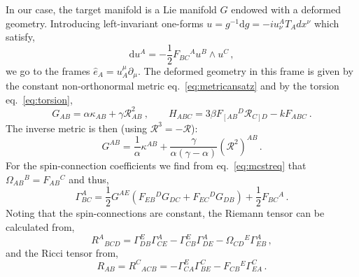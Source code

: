 \documentclass[12pt]{article}
\def\RR{{\mathfrak R}}
\def\ee{\boldsymbol{e}}
\def\RR{{\mathfrak R}}
\def\R{{\mathbb R}}
\def\be{\begin{equation}}
\def\ee{\end{equation}}
\renewcommand{\R}{\mathcal{R}}
\renewcommand{\RR}{(\mathcal{R}^{2})}
\begin{document}
In our case, the target manifold is a Lie manifold $G$ endowed with a deformed geometry. Introducing  left-invariant one-forms $u=g^{-1}\mathrm{d}g = -i u^{A}_\nu T_A  d x^\nu  $ which satisfy,
\begin{equation}\label{eq:mcstreq}
\mathrm{d}u^{A}  = -\frac{1}{2} F_{BC}{}^A u^B \wedge u^C \,,
\end{equation}
we go to the frames $\hat{e}_A = u_A^\mu \partial_\mu$.
The deformed geometry in this frame is given by the constant non-orthonormal metric eq.~\eqref{eq:metricansatz} and by the torsion eq.~\eqref{eq:torsion},
 \be
 G_{AB} =  \alpha \kappa_{AB} +\gamma   \R^{2}_{AB} \ , \qquad H_{ABC}=  3 \beta F_{\left[AB\right.}{}^{D}\R_{\left.C\right]D} -k F_{ABC}  \ .
 \ee
The inverse metric is then (using $\R^{3} = -\R$):
\begin{equation}
G^{AB} = \frac{1}{\alpha}\kappa^{AB} + \frac{\gamma}{\alpha(\gamma - \alpha)}\RR^{AB}\,.
\end{equation}
For the spin-connection coefficients we find from eq.~\eqref{eq:mcstreq} that $\Omega_{AB}{}^B = F_{AB}{}^C$ and thus,
\begin{equation}\label{eq:spinconn}
\Gamma^{A}_{BC} = \frac{1}{2}G^{AE}\left(F_{EB}{}^{D}G_{DC} + F_{EC}{}^{D}G_{DB} \right) + \frac{1}{2}F_{BC}{}^{A}\,.
\end{equation}
Noting that the spin-connections are constant, the Riemann tensor can be calculated from,
\begin{equation}
R^{A}{}_{BCD} = \Gamma^{E}_{DB}\Gamma^{A}_{CE} - \Gamma^{E}_{CB}\Gamma^{A}_{DE}-\Omega_{CD}{}^{E}\Gamma^{A}_{EB}\,,
\end{equation}
and the Ricci tensor from,
\begin{equation}
R_{AB} = R^{C}{}_{ACB} = -\Gamma^{E}_{CA}\Gamma^{C}_{BE} -F_{CB}{}^{E}\Gamma^{C}_{EA}\,.
\end{equation}


\end{document}
